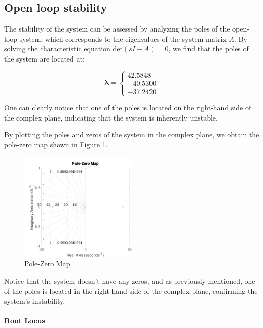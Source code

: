\subsection{Open loop stability}
\label{subsec:open_loop_stability}

The stability of the system can be assessed by analyzing the poles of the open-loop system, which corresponds to the eigenvalues of the system matrix $A$.
By solving the characteristic equation $\text{det}(sI - A) = 0$, we find that the poles of the system are located at:

\begin{equation}
    \mathbf{\lambda} =
    \begin{cases}
        42.5848  \\
        -40.5300 \\
        -37.2420
    \end{cases}
\end{equation}

One can clearly notice that one of the poles is located on the right-hand side of the complex plane, indicating that the system is inherently unstable.

By plotting the poles and zeros of the system in the complex plane, we obtain the pole-zero map shown in Figure \ref{fig:pole_zero_map}.

\begin{figure}[H]
    \centering
    \includegraphics[width=0.5\textwidth]{./img/MATLAB/analysis/pole_zero_map.pdf}
    \caption{Pole-Zero Map}
    \label{fig:pole_zero_map}
\end{figure}

Notice that the system doesn't have any zeros, and as previously mentioned, one of the poles is located in the right-hand side of the complex plane, confirming the system's instability.


\paragraph{Root Locus}

